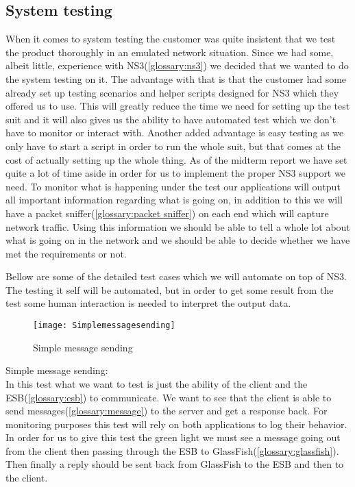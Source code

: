     \subsection{System testing}\label{System testing}
    When it comes to system testing the customer was quite insistent that we test the product thoroughly in an emulated network situation. Since we had some, albeit little, experience with NS3(\ref{glossary:ns3}) we decided that we wanted to do the system testing on it. The advantage with that is that the customer had some already set up testing scenarios and helper scripts designed for NS3 which they offered us to use. This will greatly reduce the time we need for setting up the test suit and it will also gives us the ability to have automated test which we don’t have to monitor or interact with. Another added advantage is easy testing as we only have to start a script in order to run the whole suit, but that comes at the cost of actually setting up the whole thing. As of the midterm report we have set quite a lot of time aside in order for us to implement the proper NS3 support we need. To monitor what is happening under the test our applications will output all important information regarding what is going on, in addition to this we will have a packet sniffer(\ref{glossary:packet sniffer}) on each end which will capture network traffic. Using this information we should be able to tell a whole lot about what is going on in the network and we should be able to decide whether we have met the requirements or not.

    Bellow are some of the detailed test cases which we will automate on top of NS3. The testing it self will be automated, but in order to get some result from the test some human interaction is needed to interpret the output data.

    \begin{figure}[h]
        \centering
        \texttt{[image: Simplemessagesending]}
        \caption{Simple message sending}
        \label{fig:Simple message sending}
    \end{figure}

    Simple message sending:\\
    In this test what we want to test is just the ability of the client and the ESB(\ref{glossary:esb}) to communicate. We want to see that the client is able to send messages(\ref{glossary:message}) to the server and get a response back. For monitoring purposes this test will rely on both applications to log their behavior. In order for us to give this test the green light we must see a message going out from the client then passing through the ESB to GlassFish(\ref{glossary:glassfish}). Then finally a reply should be sent back from GlassFish to the ESB and then to the client.

